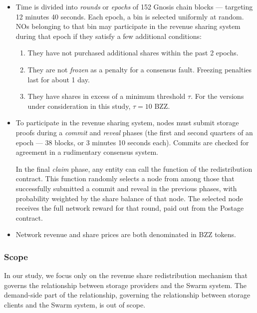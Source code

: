 \begin{itemize}
  \item
    Time is divided into \emph{rounds} or \emph{epochs} of 152 Gnosis chain blocks --- targeting 12 minutes 40 seconds.
    Each epoch, a bin is selected uniformly at random.
    NOs belonging to that bin may participate in the revenue sharing system during that epoch if they satisfy a few additional conditions:
    \begin{enumerate}
      \item They have not purchased additional shares within the past 2 epochs.
      \item They are not \emph{frozen} as a penalty for a consensus fault. Freezing penalties last for about 1 day.
      \item They have shares in excess of a minimum threshold $\tau$. For the versions under consideration in this study, $\tau=10$ BZZ.
    \end{enumerate}

  \item
    To participate in the revenue sharing system, nodes must submit storage proofs during a \emph{commit} and \emph{reveal} phases (the first and second quarters of an epoch --- 38 blocks, or 3 minutes 10 seconds each).
    Commits are checked for agreement in a rudimentary consensus system.
    
    In the final \emph{claim} phase, any entity can call the  function of the redistribution contract.
    This function randomly selects a node from among those that successfully submitted a commit and reveal in the previous phases, with probability weighted by the share balance of that node.
    The selected node receives the full network reward for that round, paid out from the Postage contract.

  \item
    Network revenue and share prices are both denominated in BZZ tokens.

\end{itemize}

\subsubsection{Scope}
\label{section:scope}

In our study, we focus only on the revenue share redistribution mechanism that governs the relationship between storage providers and the Swarm system.
%
The demand-side part of the relationship, governing the relationship between storage clients and the Swarm system, is out of scope.


